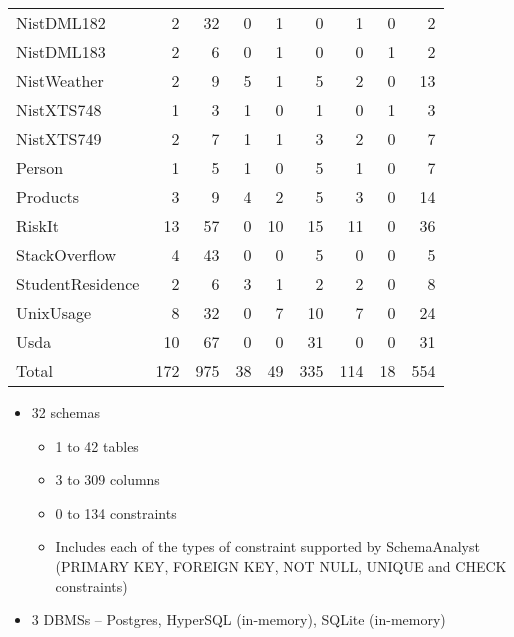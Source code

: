 \begin{table}[t!]
{\begin{tabular}{l@{\hskip -5pt}rrrrrrrr}
				NistDML182 & 2 & 32 & 0 & 1 & 0 & 1 & 0 & 2 \\
				NistDML183 & 2 & 6 & 0 & 1 & 0 & 0 & 1 & 2 \\
				NistWeather & 2 & 9 & 5 & 1 & 5 & 2 & 0 & 13 \\
				NistXTS748 & 1 & 3 & 1 & 0 & 1 & 0 & 1 & 3 \\
				NistXTS749 & 2 & 7 & 1 & 1 & 3 & 2 & 0 & 7 \\
				Person & 1 & 5 & 1 & 0 & 5 & 1 & 0 & 7 \\
				Products & 3 & 9 & 4 & 2 & 5 & 3 & 0 & 14 \\
				RiskIt & 13 & 57 & 0 & 10 & 15 & 11 & 0 & 36 \\
				StackOverflow & 4 & 43 & 0 & 0 & 5 & 0 & 0 & 5 \\
				StudentResidence & 2 & 6 & 3 & 1 & 2 & 2 & 0 & 8 \\
				UnixUsage & 8 & 32 & 0 & 7 & 10 & 7 & 0 & 24 \\
				Usda & 10 & 67 & 0 & 0 & 31 & 0 & 0 & 31 \\
				\hline
				{Total} & 172 & 975 & 38 & 49 & 335 & 114 & 18 & 554 \\
				\hline

			\end{tabular}
		}
	\end{table}

	\begin{itemize}
		\item 32 schemas
		\begin{itemize}
			\item 1 to 42 tables
			\item 3 to 309 columns
			\item 0 to 134 constraints
			\item Includes each of the types of constraint supported by SchemaAnalyst (PRIMARY KEY, FOREIGN KEY, NOT NULL, UNIQUE and CHECK constraints)
		\end{itemize}
		\item 3 DBMSs -- Postgres, HyperSQL (in-memory), SQLite (in-memory)

	\end{itemize}
